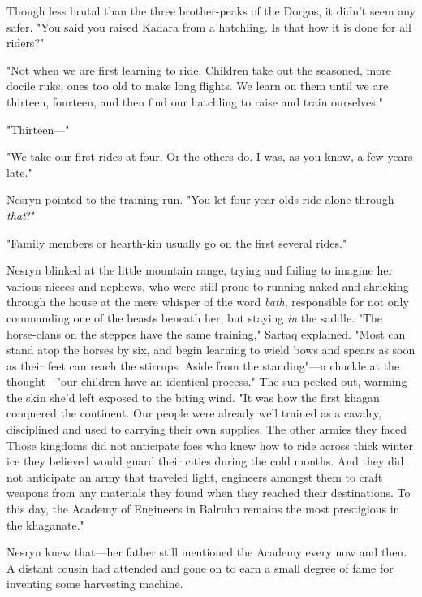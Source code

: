 Though less brutal than the three brother-peaks of the Dorgos, it didn't seem any safer. "You said you raised Kadara from a hatchling. Is that how it is done for all riders?"

"Not when we are first learning to ride. Children take out the seasoned, more docile ruks, ones too old to make long flights. We learn on them until we are thirteen, fourteen, and then find our hatchling to raise and train ourselves."

"Thirteen---"

"We take our first rides at four. Or the others do. I was, as you know, a few years late."

Nesryn pointed to the training run. "You let four-year-olds ride alone through \emph{that}?"

"Family members or hearth-kin usually go on the first several rides."

Nesryn blinked at the little mountain range, trying and failing to imagine her various nieces and nephews, who were still prone to running naked and shrieking through the house at the mere whisper of the word
\emph{bath}, responsible for not only commanding one of the beasts beneath her, but staying \emph{in} the saddle. "The horse-clans on the steppes have the same training," Sartaq explained. "Most can stand atop the horses by six, and begin learning to wield bows and spears as soon as their feet can reach the stirrups. Aside from the standing"---a chuckle at the thought---"our children have an identical process." The sun peeked out, warming the skin she'd left exposed to the biting wind. "It was how the first khagan conquered the continent. Our people were already well trained as a cavalry, disciplined and used to carrying their own supplies. The other armies they faced  Those kingdoms did not anticipate foes who knew how to ride across thick winter ice they believed would guard their cities during the cold months. And they did not anticipate an army that traveled light, engineers amongst them to craft weapons from any materials they found when they reached their destinations. To this day, the Academy of Engineers in Balruhn remains the most prestigious in the khaganate."

Nesryn knew that---her father still mentioned the Academy every now and then. A distant cousin had attended and gone on to earn a small degree of fame for inventing some harvesting machine.


